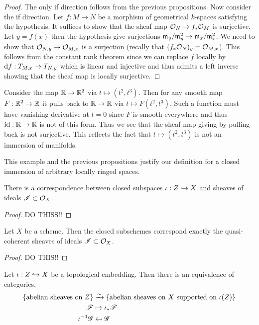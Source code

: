 \documentclass[12pt]{article}
\begin{document}
\begin{proof}
The only if direction follows from the previous propositions. Now consider the if direction. Let $f : M \to N$ be a morphism of geometrical $k$-spaces satisfying the hypothesis. It suffices to show that the sheaf map $\mathcal{O}_{N} \to f_* \mathcal{O}_{M}$ is surjective. Let $y = f(x)$ then the hypothesis give surjections $\mathfrak{m}_y / \mathfrak{m}_y^2 \to \mathfrak{m}_x / \mathfrak{m}_x^2$. We need to show that $\mathcal{O}_{N, y} \to \mathcal{O}_{M, x}$ is a surjection (recally that $(f_* \mathcal{O}_{N})_y = \mathcal{O}_{M, x}$). This follows from the constant rank theorem since we can replace $f$ locally by $\mathrm{d}{f} : T_{M,x} \to T_{N,y}$ which is linear and injective and thus admits a left inverse showing that the sheaf map is locally surjective.
\end{proof}


\begin{example}
Consider the map $\mathbb{R} \to \mathbb{R}^2$ via $t \mapsto (t^2, t^3)$. Then for any smooth map $F : \mathbb{R}^2 \to \mathbb{R}$ it pulls back to $\mathbb{R} \to \mathbb{R}$ via $t \mapsto F(t^2, t^3)$. Such a function must have vanishing derivative at $t = 0$ since $F$ is smooth everywhere and thus $\mathrm{id} : \mathbb{R} \to \mathbb{R}$ is not of this form. Thus we see that the sheaf map giving by pulling back is not surjective. This reflects the fact that $t \mapsto (t^2, t^3)$ is not an immersion of manifolds.
\end{example}

\begin{rmk}
This example and the previous propositions justify our definition for a closed immersion of arbitrary locally ringed spaces.
\end{rmk}

\begin{prop}
There is a correspondence between closed subspaces $\iota : Z \hookrightarrow X$ and sheaves of ideals $\mathscr{I} \subset \mathcal{O}_{X}$.
\end{prop}

\begin{proof}
DO THISS!!
\end{proof}

\begin{prop}
Let $X$ be a scheme. Then the closed subschemes correspond exactly the quasi-coherent sheaves of ideals $\mathscr{I} \subset \mathcal{O}_{X}$.
\end{prop}

\begin{proof}
DO THIS!!
\end{proof}

\begin{lemma}
Let $\iota : Z \hookrightarrow X$ be a topological embedding. Then there is an equivalence of categories,
\begin{align*}
\{ \text{abelian sheaves on } Z \} & \xrightarrow{\sim} \{ \text{abelian sheaves on } X \text{ supported on } \iota(Z) \}
\\
\mathscr{F} & \mapsto \iota_* \mathscr{F}
\\
\iota^{-1} \mathscr{G} & \mapsfrom \mathscr{G}
\end{align*}
\end{lemma}
\end{document}
